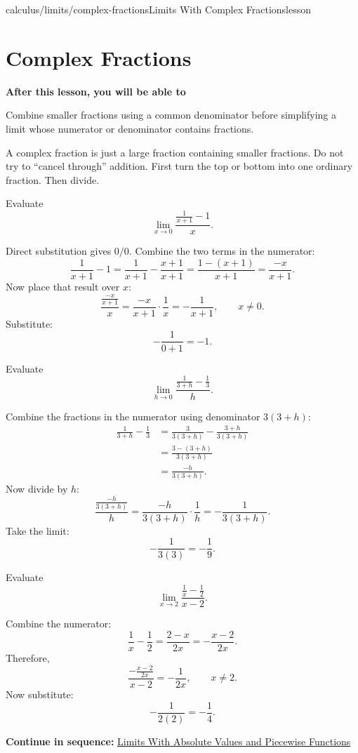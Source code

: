\documentclass[11pt,openany]{book}
\theoremstyle{bgplain}
\newcounter{bgexample}[chapter]
\newcommand{\webnext}[2]{%
  \par\addvspace{1.2em}\noindent{\color{BGLine}\rule{\textwidth}{0.35pt}}\par\smallskip
  {\small\color{BGGray}\textbf{Continue in sequence:} \hyperlink{web:#1}{#2}}\par
}
\newcommand{\lessonobjective}[1]{%
  \par\Needspace{4\baselineskip}\addvspace{0.6em}%
  {\bfseries\color{BGInk}After this lesson, you will be able to}\par\smallskip
  #1\par\addvspace{0.5em}%
}
\begin{document}
\begin{webpage}{calculus/limits/complex-fractions}{Limits With Complex Fractions}{lesson}
\section{Complex Fractions}

\lessonobjective{
Combine smaller fractions using a common denominator before simplifying a limit whose numerator or denominator contains fractions.
}

\begin{bgconcept}
A complex fraction is just a large fraction containing smaller fractions. Do not try to ``cancel through'' addition. First turn the top or bottom into one ordinary fraction. Then divide.
\end{bgconcept}

\begin{bgguided}[title={Combine the numerator first}]
Evaluate
\[
  \lim_{x\to0}\frac{\frac1{x+1}-1}{x}.
\]

\begin{bgsolution}
Direct substitution gives \(0/0\). Combine the two terms in the numerator:
\[
  \frac1{x+1}-1
  =\frac1{x+1}-\frac{x+1}{x+1}
  =\frac{1-(x+1)}{x+1}
  =\frac{-x}{x+1}.
\]
Now place that result over \(x\):
\[
  \frac{\frac{-x}{x+1}}{x}
  =\frac{-x}{x+1}\cdot\frac1x
  =-\frac1{x+1},\qquad x\ne0.
\]
Substitute:
\[
  -\frac1{0+1}=\boxed{-1}.
\]
\end{bgsolution}
\end{bgguided}

\begin{bgexample}[title={Difference quotient for a reciprocal}]
Evaluate
\[
  \lim_{h\to0}
  \frac{\frac1{3+h}-\frac13}{h}.
\]

\begin{bgsolution}
Combine the fractions in the numerator using denominator \(3(3+h)\):
\begin{align*}
\frac1{3+h}-\frac13
&=\frac3{3(3+h)}-\frac{3+h}{3(3+h)}\\
&=\frac{3-(3+h)}{3(3+h)}\\
&=\frac{-h}{3(3+h)}.
\end{align*}
Now divide by \(h\):
\[
  \frac{\frac{-h}{3(3+h)}}{h}
  =\frac{-h}{3(3+h)}\cdot\frac1h
  =-\frac1{3(3+h)}.
\]
Take the limit:
\[
  -\frac1{3(3)}=\boxed{-\frac19}.
\]
\end{bgsolution}
\end{bgexample}

\begin{bgexample}[title={Exam-level: two rational terms}]
Evaluate
\[
  \lim_{x\to2}
  \frac{\frac1x-\frac12}{x-2}.
\]

\begin{bgsolution}
Combine the numerator:
\[
  \frac1x-\frac12=\frac{2-x}{2x}=-\frac{x-2}{2x}.
\]
Therefore,
\[
  \frac{-\frac{x-2}{2x}}{x-2}
  =-\frac1{2x},\qquad x\ne2.
\]
Now substitute:
\[
  -\frac1{2(2)}=\boxed{-\frac14}.
\]
\end{bgsolution}
\end{bgexample}
\webnext{calculus/limits/absolute-value-piecewise}{Limits With Absolute Values and Piecewise Functions}
\end{webpage}
\end{document}
